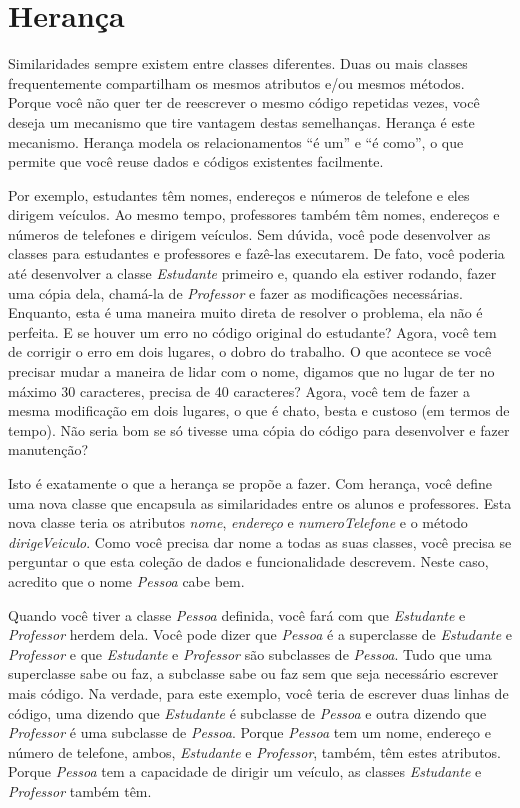 \documentclass[
	11pt,				%
	openright,
	twoside,			%
	a4paper,			%
	english,			%
	french,
	brazil,				%
	sumario=tradicional
	]{abntex2}
\begin{document}
\section{Herança}

Similaridades sempre existem entre classes diferentes. Duas ou mais classes frequentemente compartilham os mesmos atributos e/ou mesmos métodos. Porque você não quer ter de reescrever o mesmo código repetidas vezes, você deseja um mecanismo que tire vantagem destas semelhanças. Herança é este mecanismo. Herança modela os relacionamentos ``é um'' e ``é como'', o que permite que você reuse dados e códigos existentes facilmente.

Por exemplo, estudantes têm nomes, endereços e números de telefone e eles dirigem veículos. Ao mesmo tempo, professores também têm nomes, endereços e números de telefones e dirigem veículos. Sem dúvida, você pode desenvolver as classes para estudantes e professores e fazê-las executarem. De fato, você poderia até desenvolver a classe \emph{Estudante} primeiro e, quando ela estiver rodando, fazer uma cópia dela, chamá-la de \emph{Professor} e fazer as modificações necessárias. Enquanto, esta é uma maneira muito direta de resolver o problema, ela não é perfeita. E se houver um erro no código original do estudante? Agora, você tem de corrigir o erro em dois lugares, o dobro do trabalho. O que acontece se você precisar mudar a maneira de lidar com o nome, digamos que no lugar de ter no máximo 30 caracteres, precisa de 40 caracteres? Agora, você tem de fazer a mesma modificação em dois lugares, o que é chato, besta e custoso (em termos de tempo). Não seria bom se só tivesse uma cópia do código para desenvolver e fazer manutenção?

Isto é exatamente o que a herança se propõe a fazer. Com herança, você define uma nova classe que encapsula as similaridades entre os alunos e professores. Esta nova classe teria os atributos \emph{nome}, \emph{endereço} e \emph{numeroTelefone} e o método \emph{dirigeVeiculo}. Como você precisa dar nome a todas as suas classes, você precisa se perguntar o que esta coleção de dados e funcionalidade descrevem. Neste caso, acredito que o nome \emph{Pessoa} cabe bem.

Quando você tiver a classe \emph{Pessoa} definida, você fará com que \emph{Estudante} e \emph{Professor} herdem dela. Você pode dizer que \emph{Pessoa} é a superclasse de \emph{Estudante} e \emph{Professor} e que \emph{Estudante} e \emph{Professor} são subclasses de \emph{Pessoa}. Tudo que uma superclasse sabe ou faz, a subclasse sabe ou faz sem que seja necessário escrever mais código. Na verdade, para este exemplo, você teria de escrever duas linhas de código, uma dizendo que \emph{Estudante} é subclasse de \emph{Pessoa} e outra dizendo que \emph{Professor} é uma subclasse de \emph{Pessoa}. Porque \emph{Pessoa} tem um nome, endereço e número de telefone, ambos, \emph{Estudante} e \emph{Professor}, também, têm estes atributos. Porque \emph{Pessoa} tem a capacidade de dirigir um veículo, as classes \emph{Estudante} e \emph{Professor} também têm.
\end{document}

